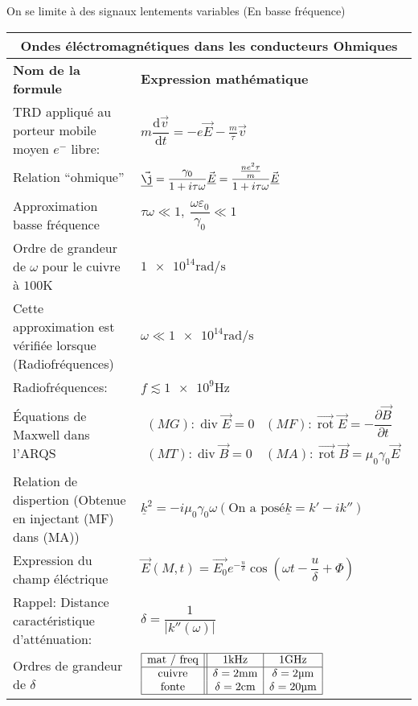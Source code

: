 \documentclass[10pt,a4paper,titlepage,portrait]{article}
\renewcommand{\d}
{
    \mathrm{d}
}
\newcommand*{\dv}[2]
{
    \dfrac{\d#1}{\d#2}
}
\newcommand*{\dpv}[2]
{
    \dfrac{\partial#1}{\partial#2}
}
\newcommand{\rot}
{
    \vec{\operatorname{rot}}
}
\renewcommand{\div}
{
    \operatorname{div}
}
\renewcommand{\arraystretch}{2}
\begin{document}
\begin{center}
On se limite à des signaux lentements variables (En basse fréquence)

\begin{table}[H]
    \centering
    \renewcommand{\arraystretch}{1.5} %
    \setlength{\tabcolsep}{8pt} %
    \begin{tabular}{@{}p{9cm}p{10cm}@{}}
        \toprule
        \multicolumn{2}{c}{\textbf{Ondes éléctromagnétiques dans les conducteurs Ohmiques}} \\
        \midrule
        \textbf{Nom de la formule} & \textbf{Expression mathématique} \\
        \midrule
        TRD appliqué au porteur mobile moyen $e^-$ libre: & $m\dv{\vec{v}}{t} = -e\vec{E} - \frac{m}{\tau}\vec{v}$ \\
        Relation ``ohmique'' & $\vec{\underline{\j}} =\dfrac{\gamma_0}{1+i\tau\omega}\vec{\underline{E}} = \dfrac{\frac{ne^2\tau}{m}}{1+i\tau\omega}\vec{\underline{E}}$ \\
        Approximation basse fréquence & $\tau\omega \ll 1, \ \dfrac{\omega\varepsilon_0}{\gamma_0}\ll1$ \\ 
        Ordre de grandeur de $\omega$ pour le cuivre à $\num{100} \unit{\kelvin}$ & $\num{1e14} \unit{\radian\per\second}$ \\
        Cette approximation est vérifiée lorsque (Radiofréquences) & $\omega \ll \num{1e14}\unit{\radian\per\second}$ \\
        Radiofréquences: & $f \lesssim \num{1e9}\unit{\Hz}$ \\
        Équations de Maxwell dans l'ARQS & $\begin{matrix}(MG): \div \vec{E} = 0 & (MF): \rot\vec{E} = -\dpv{\vec{B}}{t} \\ (MT): \div \vec{B} = 0 & (MA): \rot \vec{B} = \mu_0\gamma_0\vec{E}\end{matrix}$ \\
        Relation de dispertion (Obtenue en injectant (MF) dans (MA))& $\underline{k}^2 = -i\mu_0\gamma_0\omega (\text{On a posé} \underline{k} = k'-ik'')$ \\
        Expression du champ éléctrique & $\vec{E}(M,t )=\vec{E_0}e^{-\frac{u}{\delta}}\cos\left(\omega t - \dfrac{u}{\delta} + \Phi\right)$ \\
        Rappel: Distance caractéristique d'atténuation: & $\delta = \dfrac{1}{|k''(\omega)|}$ \\ 
        Ordres de grandeur de $\delta$ & $\begin{array}{|c||c|c|} \hline \text{mat / freq} & \num{1}\unit{\kHz} & \num{1}\unit{\GHz} \\ \hline \text{cuivre} & \delta = \num{2}\unit{\mm} & \delta = \num{2}\unit{\micro\meter} \\ \text{fonte} & \delta =  \num{2}\unit{\cm} & \delta = \num{20}\unit{\micro\meter} \\ \hline \end{array}$ \\ 

\end{tabular}
\end{table}
\end{center}
\end{document}
